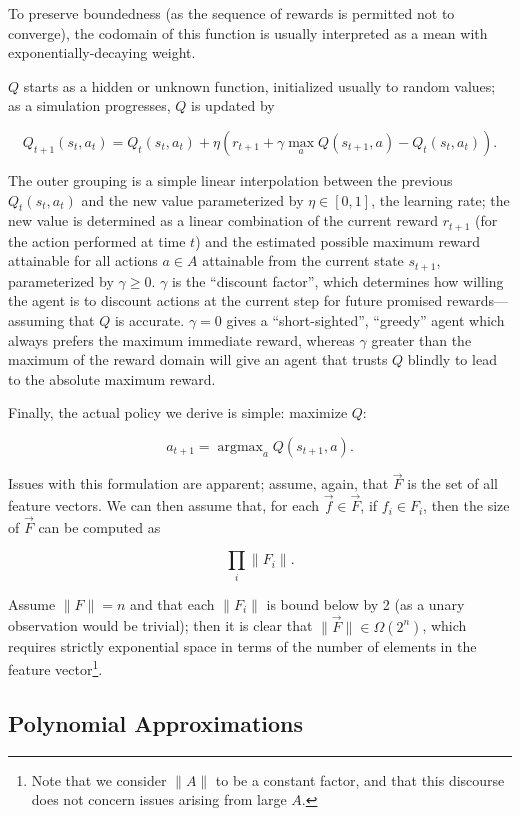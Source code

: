 \documentclass{article}
\begin{document}
	To preserve boundedness (as the sequence of rewards is permitted not to
	converge), the codomain of this function is usually interpreted as a mean
	with exponentially-decaying weight.

	$Q$ starts as a hidden or unknown function, initialized usually to random
	values; as a simulation progresses, $Q$ is updated by

	$$
	Q_{t+1}(s_t,a_t) = Q_t(s_t,a_t) + \eta ( r_{t+1} + \gamma \operatorname{max}_a Q(s_{t+1},a) - Q_t(s_t,a_t) ).
	$$

	The outer grouping is a simple linear interpolation between the previous
	$Q_t(s_t,a_t)$ and the new value parameterized by $\eta \in [0, 1]$, the
	learning rate; the new value is determined as a linear combination of the
	current reward $r_{t+1}$ (for the action performed at time $t$) and the
	estimated possible maximum reward attainable for all actions $a \in A$
	attainable from the current state $s_{t+1}$, parameterized by $\gamma \geq
	0$. $\gamma$ is the ``discount factor'', which determines how willing the
	agent is to discount actions at the current step for future promised
	rewards---assuming that $Q$ is accurate. $\gamma = 0$ gives a
	``short-sighted'', ``greedy'' agent which always prefers the maximum immediate
	reward, whereas $\gamma$ greater than the maximum of the reward domain will
	give an agent that trusts $Q$ blindly to lead to the absolute maximum
	reward.

	Finally, the actual policy we derive is simple: maximize $Q$:

	$$
	a_{t+1} = \operatorname{argmax}_a Q(s_{t+1}, a).
	$$

	Issues with this formulation are apparent; assume, again, that $\vec{F}$ is
	the set of all feature vectors. We can then assume that, for each $\vec{f}
	\in \vec{F}$, if $f_i \in F_i$, then the size of $\vec{F}$ can be computed
	as

	$$
	\prod_i \|F_i\|.
	$$

	Assume $\|F\| = n$ and that each $\|F_i\|$ is bound below by 2 (as a unary
	observation would be trivial); then it is clear that $\|\vec{F}\| \in
	\Omega(2^n)$, which requires strictly exponential space in terms of the
	number of elements in the feature vector\footnote{Note that we consider
	$\|A\|$ to be a constant factor, and that this discourse does not concern
	issues arising from large $A$.}.

\subsection{Polynomial Approximations}
\end{document}
